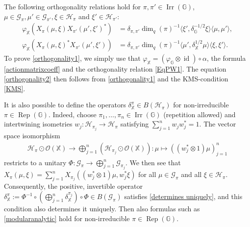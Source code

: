 \documentclass[reqno]{amsart}
\numberwithin{equation}{section}
\DeclareMathOperator{\id}{\mathrm{id}}
\DeclareMathOperator{\Rep}{\mathrm{Rep}}
\DeclareMathOperator{\Irr}{\mathrm{Irr}}
\newcommand{\mcG}{\mathcal{G}}
\newcommand{\mcH}{\mathcal{H}}
\newcommand{\mcO}{\mathcal{O}}
\newcommand{\G}{\mathbb{G}}
\newcommand{\X}{\mathbb{X}}
\begin{document}
The following orthogonality relations hold for $\pi, \pi' \in \Irr(\G)$,  $\mu\in \mcG_\pi, \mu'\in \mcG_{\pi'}, \xi \in \mcH_\pi$ and $\xi' \in \mcH_{\pi'}$:
    \begin{align}\label{orthogonality1}\varphi_{\X}(X_\pi(\mu, \xi)X_{\pi'}(\mu', \xi')^*)&= \delta_{\pi, \pi'}\dim_q(\pi)^{-1}\langle \xi', \delta_\G^{-1/2} \xi\rangle \langle \mu, \mu'\rangle,\\\label{orthogonality2}\varphi_\mathcal{\X}(X_\pi(\mu, \xi)^*X_{\pi'}(\mu', \xi')) &= \delta_{\pi, \pi'} \dim_q(\pi)^{-1}\langle\mu', \delta_\X^{1/2}\mu\rangle\langle\xi, \xi'\rangle. \end{align}
    To prove \eqref{orthogonality1}, we simply use that $\varphi_\X= (\varphi_\G\otimes \id)\circ \alpha$, the formula \eqref{actionmatrixcoeff} and the orthogonality relation \eqref{EqPW1}. The equation \eqref{orthogonality2} then follows from \eqref{orthogonality1} and the KMS-condition \eqref{KMS}.

It is also possible to define the operators $\delta_\X^\pi\in B(\mcH_\pi)$ for non-irreducible $\pi\in \Rep(\G)$. Indeed, choose $\pi_1, \dots, \pi_n \in \Irr(\G)$ (repetition allowed) and intertwining isometries $w_j: \mcH_{\pi_j}\to \mcH_\pi$ satisfying $\sum_{j=1}^n w_j w_j^*= 1$. The vector space isomorphism
\begin{align*}
    \mcH_\pi\odot \mcO(\X)\to \bigoplus_{j=1}^n (\mcH_{\pi_j}\odot \mcO(\X)): \mu \mapsto ((w_j^*\otimes 1)\mu)_{j=1}^n
\end{align*}
restricts to a unitary $\Phi: \mcG_\pi \to \bigoplus_{j=1}^n \mcG_{\pi_j}$. We then see that
$X_\pi(\mu, \xi) = \sum_{j=1}^n X_{\pi_j}((w_j^*\otimes 1)\mu, w_j^*\xi)$ for all $\mu \in \mcG_\pi$ and all $\xi \in \mcH_\pi$. Consequently, the positive, invertible operator
$\delta_\X^\pi:= \Phi^{-1}\circ (\bigoplus_{j=1}^n \delta_\X^{\pi_j})\circ \Phi\in B(\mcG_\pi)$
satisfies \eqref{determines uniquely}, and this condition also determines it uniquely. Then also formulas such as \eqref{modularanalytic} hold for non-irreducible $\pi\in \Rep(\G)$.
\end{document}
